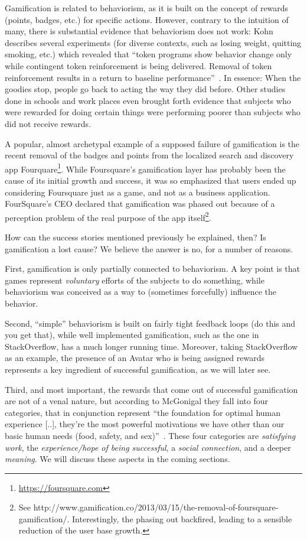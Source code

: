 Gamification is related to behaviorism, as it is built on the concept of rewards (points, badges, etc.) for specific actions.
However, contrary to the intuition of many, there is substantial evidence that behaviorism does not work: Kohn describes several experiments (for diverse contexts, such as losing weight, quitting smoking, etc.) which revealed that ``token programs show behavior change only while contingent token reinforcement is being delivered.
Removal of token reinforcement results in a return to baseline performance''~\cite{Kohn1993a}.
In essence: When the goodies stop, people go back to acting the way they did before.
Other studies done in schools and work places even brought forth evidence that subjects who were rewarded for doing certain things were performing poorer than subjects who did not receive rewards.

A popular, almost archetypal example of a supposed failure of gamification is the recent removal of the badges and points from the localized search and discovery app Fourquare\footnote{\url{https://foursquare.com}}.
While Foursquare's gamification layer has probably been the cause of its initial growth and success, it was so emphasized that users ended up considering Foursquare just as a game, and not as a business application.
FourSquare's CEO declared that gamification was phased out because of a perception problem of the real purpose of the app itself\footnote{See http://www.gamification.co/2013/03/15/the-removal-of-foursquare-gamification/.
Interestingly, the phasing out backfired, leading to a sensible reduction of the user base growth.}.

How can the success stories mentioned previously be explained, then? Is gamification a lost cause? We believe the answer is no, for a number of reasons.

First, gamification is only partially connected to behaviorism.
A key point is that games represent \emph{voluntary} efforts of the subjects to do something, while behaviorism was conceived as a way to (sometimes forcefully) influence the behavior.

Second, ``simple'' behaviorism is built on fairly tight feedback loops (do this and you get that), while well implemented gamification, such as the one in StackOverflow, has a much longer running time.
Moreover, taking StackOverflow as an example, the presence of an Avatar who is being assigned rewards represents a key ingredient of successful gamification, as we will later see.

Third, and most important, the rewards that come out of successful gamification are not of a venal nature, but according to McGonigal they fall into four categories, that in conjunction represent ``the foundation for optimal human experience [..], they're the most powerful motivations we have other than our basic human needs (food, safety, and sex)''~\cite{McGo2011a}.
These four categories are \emph{satisfying work}, the \emph{experience/hope of being successful}, a \emph{social connection}, and a deeper \emph{meaning}.
We will discuss these aspects in the coming sections.

